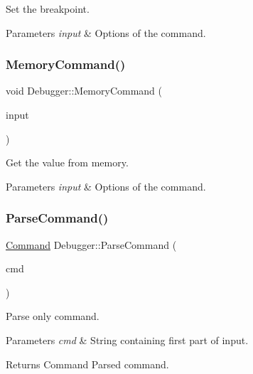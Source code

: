 Set the breakpoint. 


\begin{DoxyParams}{Parameters}
{\em input} & Options of the command. \\
\hline
\end{DoxyParams}
\mbox{\label{classDebugger_af8888a358dba262eaf7cc3f6d10b1acc}} 
\subsubsection{\texorpdfstring{Memory\+Command()}{MemoryCommand()}}
{\footnotesize\ttfamily void Debugger\+::\+Memory\+Command (\begin{DoxyParamCaption}\item[{\mbox{\hyperlink{structDebuggerCommand}{Debugger\+Command}}}]{input }\end{DoxyParamCaption})\hspace{0.3cm}{\ttfamily [private]}}



Get the value from memory. 


\begin{DoxyParams}{Parameters}
{\em input} & Options of the command. \\
\hline
\end{DoxyParams}
\mbox{\label{classDebugger_a3b76c1eed577ef8e338073f8fc980d83}} 
\subsubsection{\texorpdfstring{Parse\+Command()}{ParseCommand()}}
{\footnotesize\ttfamily \mbox{\hyperlink{debugger_8hpp_a2afce0a47a93eee73a314d53e4890153}{Command}} Debugger\+::\+Parse\+Command (\begin{DoxyParamCaption}\item[{std\+::string}]{cmd }\end{DoxyParamCaption})\hspace{0.3cm}{\ttfamily [private]}}



Parse only command. 


\begin{DoxyParams}{Parameters}
{\em cmd} & String containing first part of input. \\
\hline
\end{DoxyParams}
\begin{DoxyReturn}{Returns}
Command Parsed command. 
\end{DoxyReturn}
\mbox{\label{classDebugger_a3e9ec9c48ced49c1b6ee3ca269b52511}} 
